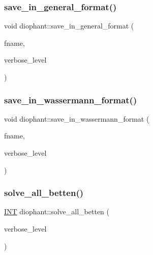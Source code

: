 \mbox{\label{classdiophant_a6a0683cb64cd550310bc09ea78e2c13f}} 
\subsubsection{\texorpdfstring{save\+\_\+in\+\_\+general\+\_\+format()}{save\_in\_general\_format()}}
{\footnotesize\ttfamily void diophant\+::save\+\_\+in\+\_\+general\+\_\+format (\begin{DoxyParamCaption}\item[{const \mbox{\hyperlink{galois_8h_ab6cc7b4aeb6ea31aba2b3fbfc83ff5e6}{B\+Y\+TE}} $\ast$}]{fname,  }\item[{\mbox{\hyperlink{galois_8h_a09fddde158a3a20bd2dcadb609de11dc}{I\+NT}}}]{verbose\+\_\+level }\end{DoxyParamCaption})}

\mbox{\label{classdiophant_aba0053de9568c9ec757915d88e030c4b}} 
\subsubsection{\texorpdfstring{save\+\_\+in\+\_\+wassermann\+\_\+format()}{save\_in\_wassermann\_format()}}
{\footnotesize\ttfamily void diophant\+::save\+\_\+in\+\_\+wassermann\+\_\+format (\begin{DoxyParamCaption}\item[{const \mbox{\hyperlink{galois_8h_ab6cc7b4aeb6ea31aba2b3fbfc83ff5e6}{B\+Y\+TE}} $\ast$}]{fname,  }\item[{\mbox{\hyperlink{galois_8h_a09fddde158a3a20bd2dcadb609de11dc}{I\+NT}}}]{verbose\+\_\+level }\end{DoxyParamCaption})}

\mbox{\label{classdiophant_a76882d819ff1d009054e84c2d6c99e94}} 
\subsubsection{\texorpdfstring{solve\+\_\+all\+\_\+betten()}{solve\_all\_betten()}}
{\footnotesize\ttfamily \mbox{\hyperlink{galois_8h_a09fddde158a3a20bd2dcadb609de11dc}{I\+NT}} diophant\+::solve\+\_\+all\+\_\+betten (\begin{DoxyParamCaption}\item[{\mbox{\hyperlink{galois_8h_a09fddde158a3a20bd2dcadb609de11dc}{I\+NT}}}]{verbose\+\_\+level }\end{DoxyParamCaption})}

